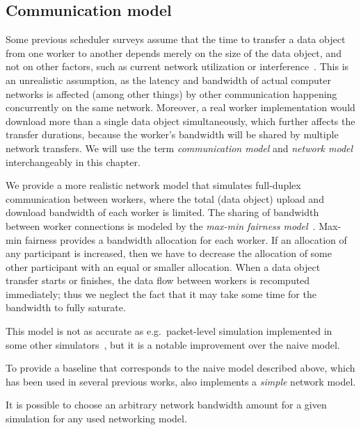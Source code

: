 \subsection{Communication model}
Some previous scheduler surveys assume that the time to transfer a data object from one worker to
another depends merely on the size of the data object, and not on other factors, such as current
network utilization or interference~\cite{tang2010list,yao2013task,wang2018list,kwok1996dynamic}. This is an unrealistic assumption, as
the latency and bandwidth of actual computer networks is affected (among other things) by other
communication happening concurrently on the same network. Moreover, a real worker implementation
would download more than a single data object simultaneously, which further affects the transfer
durations, because the worker's bandwidth will be shared by multiple network transfers. We will use
the term \emph{communication model} and \emph{network model} interchangeably in this chapter.

We provide a more realistic network model that simulates full-duplex communication between workers,
where the total (data object) upload and download bandwidth of each worker is limited. The sharing
of bandwidth between worker connections is modeled by the
\emph{max-min fairness model}~\cite{bertsekas_1992}. Max-min fairness provides a bandwidth allocation
for each worker. If an allocation of any participant is increased, then we have to decrease the
allocation of some other participant with an equal or smaller allocation. When a data object
transfer starts or finishes, the data flow between workers is recomputed immediately; thus we
neglect the fact that it may take some time for the bandwidth to fully saturate.

This model is not as accurate as e.g.\ packet-level simulation implemented in some other
simulators~\cite{simgrid}, but it is a notable improvement over the naive model.

To provide a baseline that corresponds to the naive model described above, which has been used in
several previous works, \estee{} also implements a \emph{simple} network
model.

It is possible to choose an arbitrary network bandwidth amount for a given simulation for any used
networking model.

